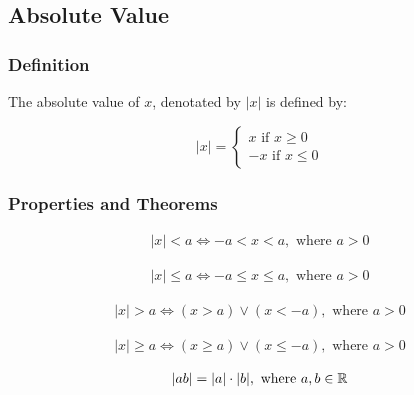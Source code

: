 \subsection{Absolute Value}

\subsubsection{Definition}

The absolute value of $x$, denotated by $|x|$ is defined by:


\begin{equation}
  |x| =   \begin{cases}
            x \text{ if } x \geq 0 \\
            -x \text{ if } x \leq 0
          \end{cases}
\end{equation}

\subsubsection{Properties and Theorems}

\begin{equation}
  \begin{array}{c}
    |x| < a \iff -a < x < a, \text{ where } a > 0
  \end{array}
\end{equation}

\begin{equation}
  \begin{array}{c}
    |x| \leq a \iff -a \leq x \leq a, \text{ where } a > 0
  \end{array}
\end{equation}

\begin{equation}
  \begin{array}{c}
    |x| > a \iff (x > a) \lor (x < -a), \text{ where } a > 0
  \end{array}
\end{equation}

\begin{equation}
  \begin{array}{c}
    |x| \geq a \iff (x \geq a) \lor (x \leq -a), \text{ where } a > 0
  \end{array}
\end{equation}

\begin{equation}
  \begin{array}{c}
    |ab| = |a| \cdot |b|, \text{ where } a,b \in \mathbb{R}
  \end{array}
\end{equation}

